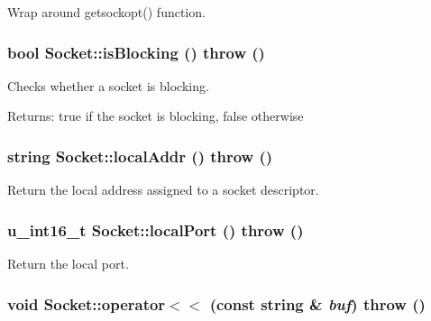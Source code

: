 Wrap around getsockopt() function. 

\hypertarget{classSocket_b09cfdaf17af3afd7c9cd7324aee9789}{
\subsubsection[{isBlocking}]{\setlength{\rightskip}{0pt plus 5cm}bool Socket::isBlocking ()  throw ()}}
\label{classSocket_b09cfdaf17af3afd7c9cd7324aee9789}


Checks whether a socket is blocking. 

\begin{Desc}
\item[Returns:]true if the socket is blocking, false otherwise \end{Desc}
\hypertarget{classSocket_4d5155fc72ee36856c0d9ae9b0f24f7d}{
\subsubsection[{localAddr}]{\setlength{\rightskip}{0pt plus 5cm}string Socket::localAddr ()  throw ()}}
\label{classSocket_4d5155fc72ee36856c0d9ae9b0f24f7d}


Return the local address assigned to a socket descriptor. 

\hypertarget{classSocket_ca6ab90fa2a1098a143cc59bb4841d80}{
\subsubsection[{localPort}]{\setlength{\rightskip}{0pt plus 5cm}u\_\-int16\_\-t Socket::localPort ()  throw ()}}
\label{classSocket_ca6ab90fa2a1098a143cc59bb4841d80}


Return the local port. 

\hypertarget{classSocket_007dc764a2d2bfb7b38fef1f9b7a9a91}{
\subsubsection[{operator$<$$<$}]{\setlength{\rightskip}{0pt plus 5cm}void Socket::operator$<$$<$ (const string \& {\em buf})  throw ()}}
\label{classSocket_007dc764a2d2bfb7b38fef1f9b7a9a91}


